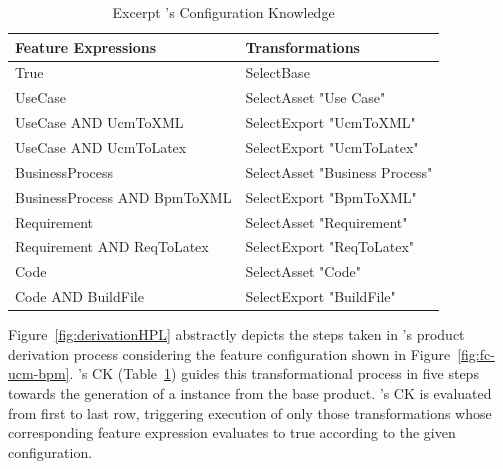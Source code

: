\begin{table}[h]
\begin{center}
\begin{tabular}{||l||l||}
  \hline
  \textbf{Feature Expressions} & \textbf{Transformations}   \\  \hline
  True & SelectBase \\  \hline
  UseCase & SelectAsset "Use Case" \\ \hline
  UseCase AND UcmToXML & SelectExport "UcmToXML"  \\ \hline
  UseCase AND UcmToLatex & SelectExport "UcmToLatex" \\ \hline
  BusinessProcess & SelectAsset "Business Process" \\ \hline
  BusinessProcess AND BpmToXML & SelectExport "BpmToXML" \\ \hline
  Requirement & SelectAsset "Requirement" \\ \hline
  Requirement AND ReqToLatex & SelectExport "ReqToLatex" \\ \hline
  Code & SelectAsset "Code" \\ \hline
  Code AND BuildFile & SelectExport "BuildFile" \\ \hline
\end{tabular}
\caption{Excerpt \hpl's Configuration Knowledge}
\label{tab:ck-hpl}
\end{center}
\end{table}


Figure~\ref{fig:derivationHPL} abstractly depicts the steps taken in \hpl's product derivation process considering the feature configuration shown in  Figure~\ref{fig:fc-ucm-bpm}. \hpl{}'s CK (Table~\ref{tab:ck-hpl}) guides this transformational process in five steps towards the generation of a \hpl{} instance from the base product. \hpl{}'s CK is evaluated from first to last row, triggering execution of only those transformations whose corresponding feature expression evaluates to true according to the given configuration.



